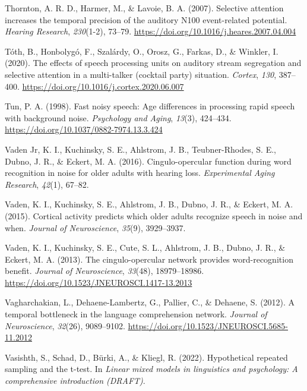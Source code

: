 \documentclass[a4paper, nobind]{templates/ociamthesis}
\newlength{\cslhangindent}
\newenvironment{CSLReferences}[2] %
 {%
  \setlength{\parindent}{0pt}
  \ifodd #1
  \let\oldpar\par
  \def\par{\hangindent=\cslhangindent\oldpar}
  \fi
  \setlength{\parskip}{1mm}
  \setlength{\baselineskip}{6mm}
 }%
 {}
\begin{document}
\begin{CSLReferences}{1}{0}
\leavevmode{}%
Thornton, A. R. D., Harmer, M., \& Lavoie, B. A. (2007). {Selective attention increases the temporal precision of the auditory N100 event-related potential}. \emph{Hearing Research}, \emph{230}(1-2), 73--79. \url{https://doi.org/10.1016/j.heares.2007.04.004}

\leavevmode{}%
Tóth, B., Honbolygó, F., Szalárdy, O., Orosz, G., Farkas, D., \& Winkler, I. (2020). {The effects of speech processing units on auditory stream segregation and selective attention in a multi-talker (cocktail party) situation}. \emph{Cortex}, \emph{130}, 387--400. \url{https://doi.org/10.1016/j.cortex.2020.06.007}

\leavevmode{}%
Tun, P. A. (1998). {Fast noisy speech: Age differences in processing rapid speech with background noise}. \emph{Psychology and Aging}, \emph{13}(3), 424--434. \url{https://doi.org/10.1037/0882-7974.13.3.424}

\leavevmode{}%
Vaden Jr, K. I., Kuchinsky, S. E., Ahlstrom, J. B., Teubner-Rhodes, S. E., Dubno, J. R., \& Eckert, M. A. (2016). Cingulo-opercular function during word recognition in noise for older adults with hearing loss. \emph{Experimental Aging Research}, \emph{42}(1), 67--82.

\leavevmode{}%
Vaden, K. I., Kuchinsky, S. E., Ahlstrom, J. B., Dubno, J. R., \& Eckert, M. A. (2015). Cortical activity predicts which older adults recognize speech in noise and when. \emph{Journal of Neuroscience}, \emph{35}(9), 3929--3937.

\leavevmode{}%
Vaden, K. I., Kuchinsky, S. E., Cute, S. L., Ahlstrom, J. B., Dubno, J. R., \& Eckert, M. A. (2013). {The cingulo-opercular network provides word-recognition benefit}. \emph{Journal of Neuroscience}, \emph{33}(48), 18979--18986. \url{https://doi.org/10.1523/JNEUROSCI.1417-13.2013}

\leavevmode{}%
Vagharchakian, L., Dehaene-Lambertz, G., Pallier, C., \& Dehaene, S. (2012). {A temporal bottleneck in the language comprehension network}. \emph{Journal of Neuroscience}, \emph{32}(26), 9089--9102. \url{https://doi.org/10.1523/JNEUROSCI.5685-11.2012}

\leavevmode{}%
Vasishth, S., Schad, D., Bürki, A., \& Kliegl, R. (2022). Hypothetical repeated sampling and the t-test. In \emph{Linear mixed models in linguistics and psychology: A comprehensive introduction (DRAFT)}.


\end{CSLReferences}
\end{document}
